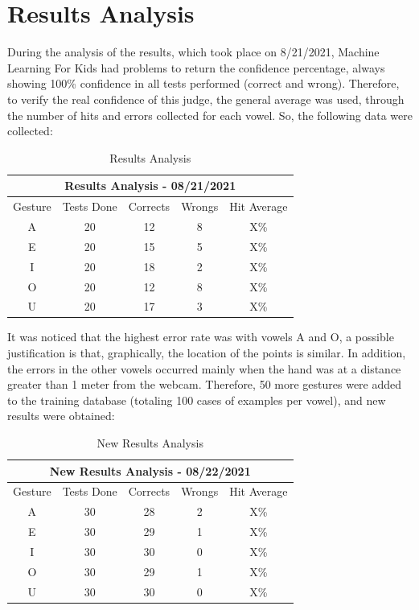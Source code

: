 \documentclass[a4paper, 12pt]{article}
\begin{document}
\section{Results Analysis}



During the analysis of the results, which took place on 8/21/2021, Machine Learning For Kids had problems to return the confidence percentage, always showing 100\% confidence in all tests performed (correct and wrong). Therefore, to verify the real confidence of this judge, the general average was used, through the number of hits and errors collected for each vowel. So, the following data were collected:


\begin{table}[h!]
    \centering
    \begin{tabular}{ |c|c|c|c|c| } 
    \hline
    \multicolumn{5}{|c|}{Results Analysis - 08/21/2021} \\
    \hline
    Gesture & Tests Done & Corrects & Wrongs & Hit Average \\
    \hline
    A & 20 & 12 & 8 & X\% \\ 
    \hline
    E & 20 & 15 & 5 & X\% \\
    \hline
    I & 20 & 18 & 2 & X\% \\
    \hline
    O & 20 & 12 & 8 & X\% \\
    \hline
    U & 20 & 17 & 3 & X\% \\
    \hline
    \end{tabular}
    \caption{Results Analysis}
    \label{tab:results_analysis}
\end{table}

It was noticed that the highest error rate was with vowels A and O, a possible justification is that, graphically, the location of the points is similar. In addition, the errors in the other vowels occurred mainly when the hand was at a distance greater than 1 meter from the webcam. Therefore, 50 more gestures were added to the training database (totaling 100 cases of examples per vowel), and new results were obtained:

\begin{table}[h!]
    \centering
    \begin{tabular}{ |c|c|c|c|c| } 
    \hline
    \multicolumn{5}{|c|}{New Results Analysis - 08/22/2021} \\
    \hline
    Gesture & Tests Done & Corrects & Wrongs & Hit Average \\
    \hline
    A & 30 & 28 & 2 & X\% \\ 
    \hline
    E & 30 & 29 & 1 & X\% \\
    \hline
    I & 30 & 30 & 0 & X\% \\
    \hline
    O & 30 & 29 & 1 & X\% \\
    \hline
    U & 30 & 30 & 0 & X\% \\
    \hline
    \end{tabular}
    \caption{New Results Analysis}
    \label{tab:results_analysis2}
\end{table}
\end{document}
